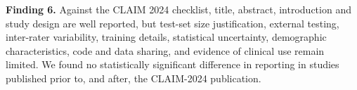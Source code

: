 \vspace{0.25cm}
\begin{mdframed}[linewidth=0.5pt, linecolor=black, backgroundcolor=blue!10]
\textbf{Finding 6.} Against the CLAIM 2024 checklist, title, abstract, introduction and study design are well reported, but test-set size justification, external testing, inter-rater variability, training details, statistical uncertainty, demographic characteristics, code and data sharing, and evidence of clinical use remain limited. We found no statistically significant difference in reporting in studies published prior to, and after, the CLAIM-2024 publication.
\end{mdframed}
\vspace{0.25cm}

